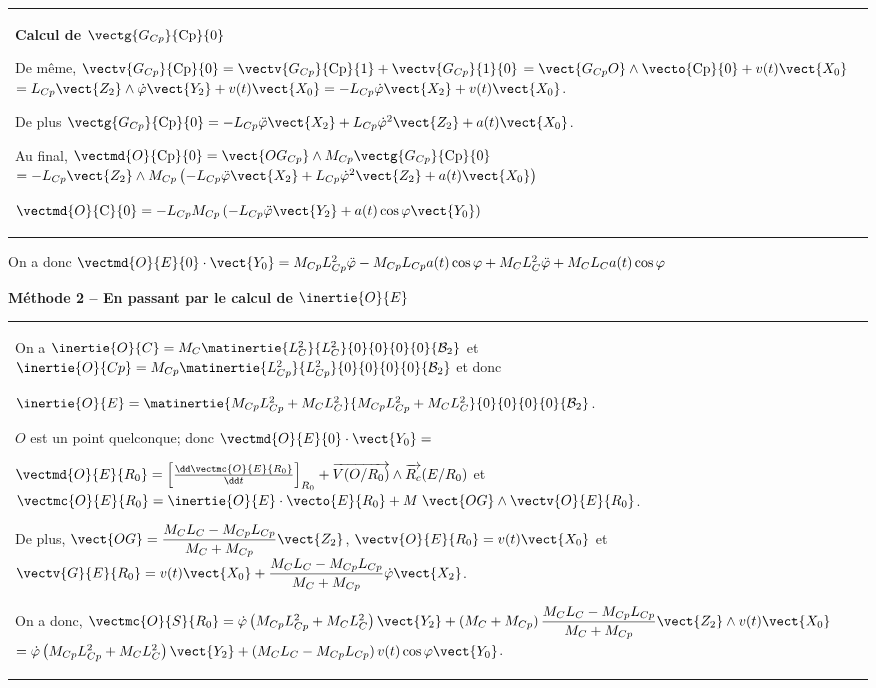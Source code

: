 \begin{corrige}
\begin{tabular}{|p{.9\linewidth}}
\textbf{Calcul de $\vectg{G_{Cp}}{\text{Cp}}{0}$}

De même, $\vectv{G_{Cp}}{\text{Cp}}{0}=\vectv{G_{Cp}}{\text{Cp}}{1}+\vectv{G_{Cp}}{\text{1}}{0}$ $=\vect{G_{Cp}O}\wedge \vecto{\text{Cp}}{0}+v(t)\vect{X_0}$ $=L_{Cp}\vect{Z_2}\wedge \dot{\varphi}\vect{Y_2}+v(t)\vect{X_0}=-L_{Cp} \dot{\varphi}\vect{X_2}+v(t)\vect{X_0}$. 

De plus  $\vectg{G_{Cp}}{\text{Cp}}{0}=-L_{Cp} \ddot{\varphi}\vect{X_2}+L_{Cp} \dot{\varphi}^2\vect{Z_2}+a(t)\vect{X_0}$. 

Au final, $\vectmd{O}{\text{Cp}}{0} = \vect{OG_{Cp}} \wedge M_{Cp}\vectg{G_{Cp}}{\text{Cp}}{0}$
$ =-L_{Cp}\vect{Z_2} \wedge M_{Cp} \left( -L_{Cp} \ddot{\varphi}\vect{X_2}+L_{Cp} \dot{\varphi}^2\vect{Z_2}+a(t)\vect{X_0}\right)$

$\vectmd{O}{\text{C}}{0} =-L_{Cp} M_{Cp} \left( -L_{Cp} \ddot{\varphi}\vect{Y_2} +a(t)\cos\varphi\vect{Y_0} \right)$
\\
\end{tabular}

On a donc $\vectmd{O}{E}{0}\cdot \vect{Y_0} =M_{Cp} L_{Cp}^2 \ddot{\varphi} -M_{Cp}L_{Cp}a(t)\cos\varphi +  M_CL_C^2 \ddot{\varphi} +M_CL_Ca(t) \cos \varphi $

\textbf{Méthode 2 -- En passant par le calcul de $\inertie{O}{E}$}

 \begin{tabular}{|p{.9\linewidth}}
On a $\inertie{O}{C}=M_C\matinertie{L_C^2}{L_C^2}{0}{0}{0}{0}{\mathcal{B}_2}$ et $\inertie{O}{Cp}=M_{Cp}\matinertie{L_{Cp}^2}{L_{Cp}^2}{0}{0}{0}{0}{\mathcal{B}_2}$ et donc 

$\inertie{O}{E}=\matinertie{M_{Cp}L_{Cp}^2+M_{C}L_{C}^2}{M_{Cp}L_{Cp}^2+M_{C}L_{C}^2}{0}{0}{0}{0}{\mathcal{B}_2}$.

$O$ est un point quelconque; donc $\vectmd{O}{E}{0}\cdot \vect{Y_0} =$

$\vectmd{O}{E}{R_0}=\left[\frac{\dd \vectmc{O}{E}{R_0}}{\dd t}\right]_{R_0}+\overrightarrow{V(O/R_0)}\wedge \overrightarrow{R_c}(E/R_0)$ et 
$\vectmc{O}{E}{R_0}=\inertie{O}{E}\cdot \vecto{E}{R_0}+M\;\vect{OG}\wedge \vectv{O}{E}{R_0}$. 

De plus, 
$\vect{OG}=\dfrac{M_CL_C-M_{Cp}L_{Cp}}{M_C+M_{Cp}}\vect{Z_2}$, $\vectv{O}{E}{R_0}=v(t)\vect{X_0}$ et
$\vectv{G}{E}{R_0}=v(t)\vect{X_0}+\dfrac{M_CL_C-M_{Cp}L_{Cp}}{M_C+M_{Cp}}\dot{\varphi}\vect{X_2}$.


On a donc, 
$\vectmc{O}{S}{R_0}=\dot{\varphi}\left(M_{Cp}L_{Cp}^2+M_{C}L_{C}^2 \right)\vect{Y_2}+\left( M_C+M_{Cp}\right) \dfrac{M_CL_C-M_{Cp}L_{Cp}}{M_C+M_{Cp}}\vect{Z_2}\wedge v(t)\vect{X_0}$
$ = \dot{\varphi}\left(M_{Cp}L_{Cp}^2+M_{C}L_{C}^2 \right)\vect{Y_2}+\left( M_CL_C-M_{Cp}L_{Cp}\right) v(t)\cos\varphi \vect{Y_0}$.


\end{tabular}
\end{corrige}
